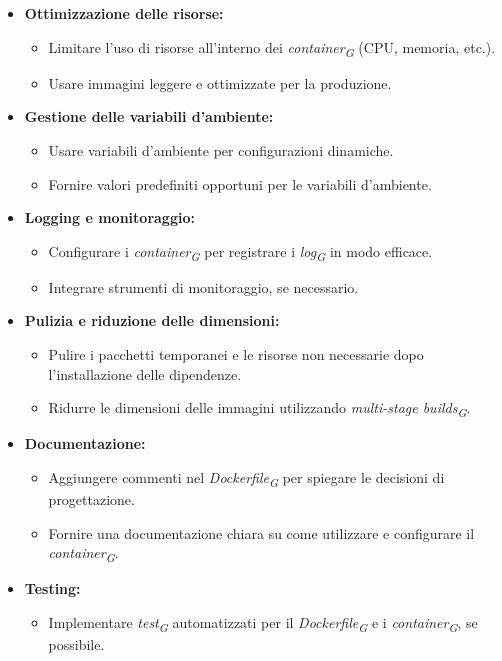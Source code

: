 \begin{itemize}
\item \textbf{Ottimizzazione delle risorse:}
    \begin{itemize}
        \item Limitare l'uso di risorse all'interno dei \textit{container}\textsubscript{\textit{G}} (CPU, memoria, etc.).
        \item Usare immagini leggere e ottimizzate per la produzione.
    \end{itemize}

\item \textbf{Gestione delle variabili d'ambiente:}
    \begin{itemize}
        \item Usare variabili d'ambiente per configurazioni dinamiche.
        \item Fornire valori predefiniti opportuni per le variabili d'ambiente.
    \end{itemize}

\item \textbf{Logging e monitoraggio:}
    \begin{itemize}
        \item Configurare i \textit{container}\textsubscript{\textit{G}} per registrare i \textit{log}\textsubscript{\textit{G}} in modo efficace.
        \item Integrare strumenti di monitoraggio, se necessario.
    \end{itemize}

\item \textbf{Pulizia e riduzione delle dimensioni:}
    \begin{itemize}
        \item Pulire i pacchetti temporanei e le risorse non necessarie dopo l'installazione delle dipendenze.
        \item Ridurre le dimensioni delle immagini utilizzando \textit{multi-stage builds}\textsubscript{\textit{G}}.
    \end{itemize}

\item \textbf{Documentazione:}
    \begin{itemize}
        \item Aggiungere commenti nel \textit{Dockerfile}\textsubscript{\textit{G}} per spiegare le decisioni di progettazione.
        \item Fornire una documentazione chiara su come utilizzare e configurare il \textit{container}\textsubscript{\textit{G}}.
    \end{itemize}

\item \textbf{Testing:}
    \begin{itemize}
        \item Implementare \textit{test}\textsubscript{\textit{G}} automatizzati per il \textit{Dockerfile}\textsubscript{\textit{G}} e i \textit{container}\textsubscript{\textit{G}}, se possibile.
    \end{itemize}
\end{itemize}
